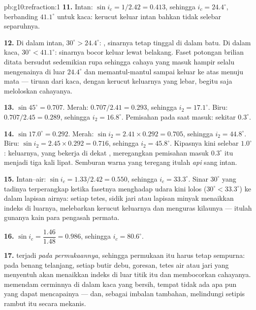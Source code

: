 \begin{solution}{pb:g10:refraction:1}
\textbf{11.} Intan: $\sin i_c = 1/2.42 = 0.413$, sehingga
$i_c = 24.4^\circ$, berbanding $41.1^\circ$ untuk kaca: kerucut keluar
intan bahkan tidak selebar separuhnya.

\textbf{12.} Di dalam intan, $30^\circ > 24.4^\circ$: , sinarnya tetap tinggal di dalam batu. Di dalam kaca,
$30^\circ < 41.1^\circ$: sinarnya bocor keluar lewat belakang. Faset
potongan brilian ditata bersudut sedemikian rupa sehingga cahaya yang
masuk hampir selalu mengenainya di luar $24.4^\circ$ dan memantul-mantul
sampai keluar ke atas menuju mata --- tiruan dari kaca, dengan kerucut
keluarnya yang lebar, begitu saja meloloskan cahayanya.

\textbf{13.} $\sin 45^\circ = 0.707$. Merah: $0.707/2.41 = 0.293$,
sehingga $i_2 = 17.1^\circ$. Biru: $0.707/2.45 = 0.289$, sehingga
$i_2 = 16.8^\circ$. Pemisahan pada saat masuk: sekitar $0.3^\circ$.

\textbf{14.} $\sin 17.0^\circ = 0.292$. Merah: $\sin i_2 = 2.41 \times
0.292 = 0.705$, sehingga $i_2 = 44.8^\circ$. Biru: $\sin i_2 = 2.45 \times
0.292 = 0.716$, sehingga $i_2 = 45.8^\circ$. Kipasnya kini
selebar $1.0^\circ$:  keluarnya, yang bekerja di dekat , meregangkan pemisahan masuk $0.3^\circ$ itu menjadi tiga kali
lipat. Semburan warna yang teregang itulah \emph{api} sang intan.

\textbf{15.} Intan--air: $\sin i_c = 1.33/2.42 = 0.550$, sehingga
$i_c = 33.3^\circ$. Sinar $30^\circ$ yang tadinya terperangkap ketika
fasetnya menghadap udara kini lolos ($30^\circ < 33.3^\circ$) ke dalam
lapisan airnya: setiap tetes, sidik jari atau lapisan minyak menaikkan
indeks di luarnya, melebarkan kerucut keluarnya dan menguras kilaunya
--- itulah gunanya kain para pengasah permata.

\textbf{16.} $\sin i_c = \dfrac{1.46}{1.48} = 0.986$, sehingga
$i_c = 80.6^\circ$.

\textbf{17.}  terjadi \emph{pada permukaannya},
sehingga permukaan itu harus tetap sempurna: pada benang telanjang,
setiap butir debu, goresan, tetes air atau jari yang menyentuh akan
menaikkan indeks di luar titik itu dan membocorkan cahayanya. 
memendam cerminnya di dalam kaca yang bersih, tempat tidak ada apa pun
yang dapat mencapainya --- dan, sebagai imbalan tambahan, melindungi
 setipis rambut itu secara mekanis.


\end{solution}

